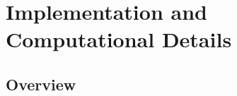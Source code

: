 \clearpage
{}
{}
\part*{Implementation and Computational Details}
\label{app:implementation}

\setcounter{chapter}{0}
\renewcommand{\thechapter}{I\arabic{chapter}}
\renewcommand{\theHchapter}{impl.\arabic{chapter}}
\makeatletter
\renewcommand{\@chapapp}{\chaptername}
\makeatother

\startcontents[impl]

\chapter{Overview}

